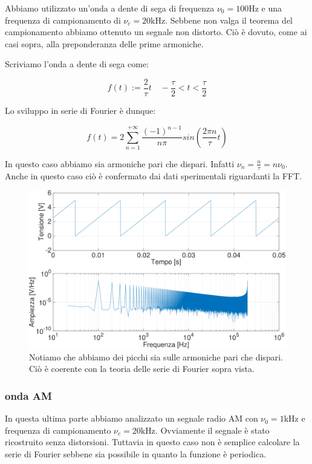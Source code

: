 Abbiamo utilizzato un'onda a dente di sega di frequenza $\nu_0=100 \si{\hertz}$ e una frequenza di campionamento di $\nu_c=20\si{\kilo\hertz}$. Sebbene non valga il teorema del campionamento abbiamo ottenuto un segnale non distorto. Ciò è dovuto, come ai casi sopra, alla preponderanza delle prime armoniche.

Scriviamo l'onda a dente di sega come: 

$$f(t):= \frac{2}{\tau}t \quad -\frac{\tau}{2}<t<\frac{\tau}{2}$$

Lo sviluppo in serie di Fourier è dunque:

\begin{equation}
f(t)=2\sum_{n=1}^{+\infty}\frac{(-1)^{n-1}}{n\pi}sin (\frac{2\pi n}{\tau}t)
\end{equation}


In questo caso abbiamo sia armoniche pari che dispari. Infatti $\nu_n=\frac{n}{\tau}=n\nu_0$. Anche in questo caso ciò è confermato dai dati sperimentali riguardanti la FFT. 

\begin{figure}[H]
\centering
	\includegraphics[width=.65\textwidth]{../E13/latex/sega100hz@10000,200000_crop.pdf}
	\caption{Notiamo che abbiamo dei picchi sia sulle armoniche pari che dispari. Ciò è coerente con la teoria delle serie di Fourier sopra vista.}
	\label{sega}
\end{figure}

\subsubsection{onda AM}

In questa ultima parte abbiamo analizzato un segnale radio AM con $\nu_0=1\si{\kilo\hertz}$ e frequenza di campionamento $\nu_c=20\si{\kilo\hertz}$. Ovviamente il segnale è stato ricostruito senza distorsioni. Tuttavia in questo caso non è semplice calcolare la serie di Fourier sebbene sia possibile in quanto la funzione è periodica. 

